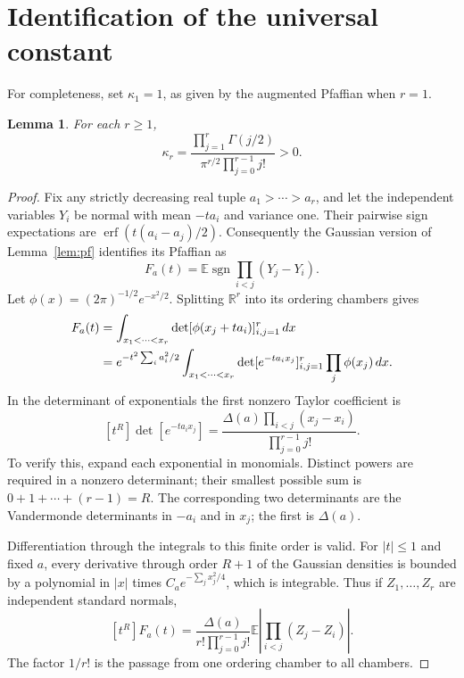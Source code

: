 \documentclass[11pt]{article}
\newtheorem{lemma}[theorem]{Lemma}
\theoremstyle{remark}
\DeclareMathOperator{\sgn}{sgn}
\newcommand{\E}{\mathbb E}
\newcommand{\R}{\mathbb R}
\begin{document}
\section{Identification of the universal constant}

For completeness, set $\kappa_1=1$, as given by the augmented
Pfaffian when $r=1$.

\begin{lemma}\label{lem:kappa}
For each $r\ge1$,
\begin{equation}\label{eq:kappa}
 \kappa_r=
 \frac{\prod_{j=1}^r\Gamma(j/2)}
      {\pi^{r/2}\prod_{j=0}^{r-1}j!}>0.
\end{equation}
\end{lemma}
\begin{proof}
Fix any strictly decreasing real tuple $a_1>\cdots>a_r$, and let the independent
variables $Y_i$ be normal with mean $-ta_i$ and variance one. Their pairwise
sign expectations are $\operatorname{erf}(t(a_i-a_j)/2)$. Consequently the
Gaussian version of Lemma~\ref{lem:pf} identifies its Pfaffian as
\[
 F_a(t)=\E\sgn\prod_{i<j}(Y_j-Y_i).
\]
Let $\phi(x)=(2\pi)^{-1/2}e^{-x^2/2}$. Splitting $\R^r$ into its ordering
chambers gives
\begin{align}
 F_a(t)
 &=\int_{x_1<\cdots<x_r}\det[\phi(x_j+ta_i)]_{i,j=1}^r\,dx\notag\\
 &=e^{-t^2\sum_i a_i^2/2}
   \int_{x_1<\cdots<x_r}\det[e^{-ta_i x_j}]_{i,j=1}^r
           \prod_j\phi(x_j)\,dx.\label{eq:gaussian}
\end{align}
In the determinant of exponentials the first nonzero Taylor coefficient is
\[
 [t^R]\det[e^{-ta_i x_j}]
 =\frac{\Delta(a)\prod_{i<j}(x_j-x_i)}{\prod_{j=0}^{r-1}j!}.
\]
To verify this, expand each exponential in monomials. Distinct powers are
required in a nonzero determinant; their smallest possible sum is
$0+1+\cdots+(r-1)=R$. The corresponding two determinants are the Vandermonde
determinants in $-a_i$ and in $x_j$; the first is $\Delta(a)$.

Differentiation through the integrals to this finite order is valid. For $|t|\le1$
and fixed $a$, every derivative through order $R+1$ of the Gaussian densities is
bounded by a polynomial in $|x|$ times $C_a e^{-\sum_j x_j^2/4}$, which is
integrable. Thus if $Z_1,\ldots,Z_r$ are independent standard normals,
\begin{equation}\label{eq:kappaintegral}
 [t^R]F_a(t)=\frac{\Delta(a)}{r!\prod_{j=0}^{r-1}j!}
              \E\left|\prod_{i<j}(Z_j-Z_i)\right|.
\end{equation}
The factor $1/r!$ is the passage from one ordering chamber to all chambers.


\end{proof}
\end{document}
